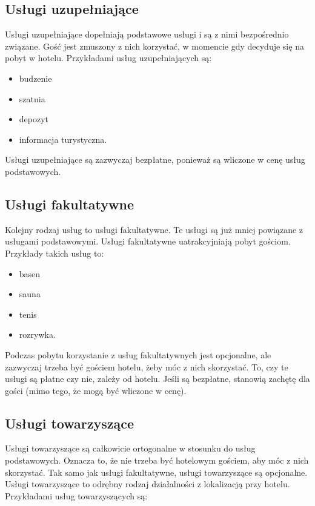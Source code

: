 \documentclass[a4paper,onecolumn,oneside,11pt,wide,floatssmall]{mwrep}
\theoremstyle{definition}
\theoremstyle{plain}%
\theoremstyle{remark}
\begin{document}
\subsection{Usługi uzupełniające}
Usługi uzupełniające dopełniają podstawowe usługi i są z nimi bezpośrednio 
związane. Gość jest zmuszony z nich korzystać, w momencie gdy decyduje się na 
pobyt w hotelu. Przykładami usług uzupełniających są:

\begin{itemize}
  \item budzenie
  \item szatnia
  \item depozyt
  \item informacja turystyczna.
\end{itemize}

Usługi uzupełniające są zazwyczaj bezpłatne, ponieważ są wliczone w cenę 
usług podstawowych.

\subsection{Usługi fakultatywne}
Kolejny rodzaj usług to usługi fakultatywne. Te usługi są już mniej 
powiązane z usługami podstawowymi. Usługi fakultatywne uatrakcyjniają pobyt 
gościom. Przykłady takich usług to:

\begin{itemize}
  \item basen
  \item sauna
  \item tenis
  \item rozrywka.
\end{itemize}

Podczas pobytu korzystanie z usług fakultatywnych jest opcjonalne, ale zazwyczaj trzeba być 
gościem hotelu, żeby móc z nich skorzystać. To, czy te usługi są płatne czy 
nie, zależy od hotelu.  Jeśli są bezpłatne, stanowią zachętę dla gości (mimo 
tego, że mogą być wliczone w cenę).

\subsection{Usługi towarzyszące}
Usługi towarzyszące są całkowicie ortogonalne w stosunku do usług 
podstawowych. Oznacza to, że nie trzeba być hotelowym gościem, aby móc z 
nich skorzystać. Tak samo jak usługi fakultatywne, usługi towarzyszące są 
opcjonalne. Usługi towarzyszące to odrębny rodzaj działalności z lokalizacją 
przy hotelu. Przykładami usług towarzyszących są:
\end{document}
